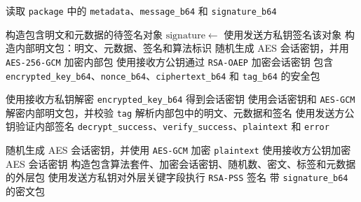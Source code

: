 \documentclass[12pt]{article}
\begin{document}
\begin{algorithm}[H]
\caption{\texttt{verify\_metadata\_signature(public\_key, package)}}
\setcounter{AlgoLine}{0}
读取 \texttt{package} 中的 \texttt{metadata}、\texttt{message\_b64} 和 \texttt{signature\_b64}\;
\end{algorithm}

\begin{algorithm}[H]
\caption{\texttt{sign\_then\_encrypt(sender\_private\_key, receiver\_public\_key, plaintext, metadata)}}
\setcounter{AlgoLine}{0}
构造包含明文和元数据的待签名对象\;
$\mathrm{signature} \leftarrow$ 使用发送方私钥签名该对象\;
构造内部明文包：明文、元数据、签名和算法标识\;
随机生成 AES 会话密钥，并用 \texttt{AES-256-GCM} 加密内部包\;
使用接收方公钥通过 \texttt{RSA-OAEP} 加密会话密钥\;
\Return 包含 \texttt{encrypted\_key\_b64}、\texttt{nonce\_b64}、\texttt{ciphertext\_b64} 和 \texttt{tag\_b64} 的安全包\;
\end{algorithm}

\begin{algorithm}[H]
\caption{\texttt{decrypt\_then\_verify(receiver\_private\_key, sender\_public\_key, secure\_package)}}
\setcounter{AlgoLine}{0}
使用接收方私钥解密 \texttt{encrypted\_key\_b64} 得到会话密钥\;
使用会话密钥和 \texttt{AES-GCM} 解密内部明文包，并校验 \texttt{tag}\;
解析内部包中的明文、元数据和签名\;
使用发送方公钥验证内部签名\;
\Return \texttt{decrypt\_success}、\texttt{verify\_success}、\texttt{plaintext} 和 \texttt{error}\;
\end{algorithm}

\begin{algorithm}[H]
\caption{\texttt{encrypt\_then\_sign(sender\_private\_key, receiver\_public\_key, plaintext, metadata)}}
\setcounter{AlgoLine}{0}
随机生成 AES 会话密钥，并使用 \texttt{AES-GCM} 加密 \texttt{plaintext}\;
使用接收方公钥加密 AES 会话密钥\;
构造包含算法套件、加密会话密钥、随机数、密文、标签和元数据的外层包\;
使用发送方私钥对外层关键字段执行 \texttt{RSA-PSS} 签名\;
\Return 带 \texttt{signature\_b64} 的密文包\;
\end{algorithm}
\end{document}
